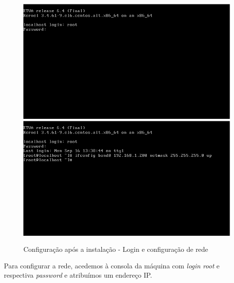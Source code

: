 \begin{figure}[H]
	\begin{center}
    \includegraphics[scale=0.3]{screenshots/install/nuxis/login.png}
    \includegraphics[scale=0.3]{screenshots/install/nuxis/configure_network.png}
    \caption{Configuração após a instalação - Login e configuração de rede}
	\label{fig:installation_enterprise_pos_02}
	\end{center}
\end{figure}

Para configurar a rede, acedemos à consola da máquina com \emph{login} \emph{root} e respectiva \emph{password} e atribuímos um endereço IP.

